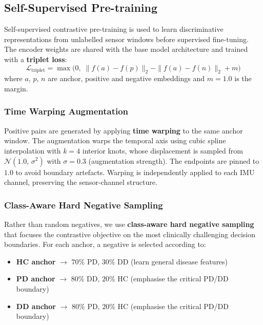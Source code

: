 \documentclass[conference]{IEEEtran}
\begin{document}
\subsection{Self-Supervised Pre-training}

Self-supervised contrastive pre-training is used to learn discriminative representations from unlabelled sensor windows before supervised fine-tuning. The encoder weights are shared with the base model architecture and trained with a \textbf{triplet loss}:
\begin{equation}
\mathcal{L}_{\text{triplet}} = \max\bigl(0,\; \|f(a){-}f(p)\|_2 - \|f(a){-}f(n)\|_2 + m\bigr)
\end{equation}
where $a$, $p$, $n$ are anchor, positive and negative embeddings and $m{=}1.0$ is the margin.

\subsubsection{Time Warping Augmentation}

Positive pairs are generated by applying \textbf{time warping} to the same anchor window. The augmentation warps the temporal axis using cubic spline interpolation with $k{=}4$ interior knots, whose displacement is sampled from $\mathcal{N}(1.0,\,\sigma^2)$ with $\sigma{=}0.3$ (augmentation strength). The endpoints are pinned to $1.0$ to avoid boundary artefacts. Warping is independently applied to each IMU channel, preserving the sensor-channel structure.

\subsubsection{Class-Aware Hard Negative Sampling}

Rather than random negatives, we use \textbf{class-aware hard negative sampling} that focuses the contrastive objective on the most clinically challenging decision boundaries. For each anchor, a negative is selected according to:

\begin{itemize}[noitemsep]
  \item \textbf{HC anchor} $\rightarrow$ $70\%$ PD, $30\%$ DD (learn general disease features)
  \item \textbf{PD anchor} $\rightarrow$ $80\%$ DD, $20\%$ HC (emphasise the critical PD/DD boundary)
  \item \textbf{DD anchor} $\rightarrow$ $80\%$ PD, $20\%$ HC (emphasise the critical PD/DD boundary)
\end{itemize}
\end{document}

